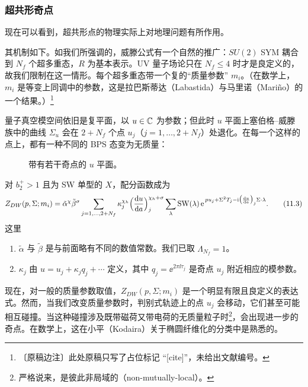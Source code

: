 \subsubsection{超共形奇点}

现在可以看到，超共形点的物理实际上对地理问题有所作用。

其机制如下。如我们所强调的，威滕公式有一个自然的推广：$SU(2)$ SYM 耦合到 $N_{f}$ 个超多重态，$R$ 为基本表示。UV 量子场论只在 $N_{f}\le4$ 时才是良定义的，故我们限制在这一情形。每个超多重态带一个复的“质量参数” $m_{i}$。（在数学上，$m_{i}$ 是等变上同调中的参数，这是拉巴斯蒂达（Labastida）与马里诺（Mariño）的一个结果。）\footnote{〔原稿边注〕此处原稿只写了占位标记 “[cite]”，未给出文献编号。}

量子真空模空间依旧是复平面，以 $u\in\mathbb{C}$ 为参数；但此时 $u$ 平面上塞伯格--威滕族中的曲线 $\Sigma_{u}$ 会在 $2+N_{f}$ 个点 $u_{j}$（$j=1,\dots,2+N_{f}$）处退化。在每一个这样的点上，都有一种不同的 BPS 态变为无质量：

\begin{figure}[H]
  \centering
  \caption{带有若干奇点的 $u$ 平面。}
  \label{fig:uplane-singularities}
\end{figure}

对 $b_{2}^{+}>1$ 且为 SW 单型的 $X$，配分函数成为
\begin{equation}
  Z_{DW}(p,\Sigma;m_{i})
  =\tilde\alpha^{\chi}\tilde\beta^{\sigma}
  \sum_{j=1,\dots,2+N_{f}}\kappa_{j}^{\chi_{h}}
  \Bigl(\frac{\mathrm{d} u}{\mathrm{d} a}\Bigr)_{j}^{\chi_{h}+\sigma}
  \sum_{\lambda}\mathrm{SW}(\lambda)\,
  \mathrm{e}^{\,p u_{j}+\Sigma^{2}T_{j}-\mathrm{i}\bigl(\frac{\mathrm{d} u}{\mathrm{d} a}\bigr)_{j}\Sigma\cdot\lambda}.
  \tag{11.3}
\end{equation}
这里
\begin{enumerate}[label=\arabic*., leftmargin=2.1em]
\item $\tilde\alpha$ 与 $\tilde\beta$ 是与前面略有不同的数值常数。我们已取 $\Lambda_{N_{f}}=1$。
\item $\kappa_{j}$ 由 $u=u_{j}+\kappa_{j}q_{j}+\cdots$ 定义，其中 $q_{j}=\ee^{2\pi\ii\tau_{j}}$ 是奇点 $u_{j}$ 附近相应的模参数。
\end{enumerate}

现在，对一般的质量参数取值，$Z_{DW}(p,\Sigma;m_{i})$ 是一个明显有限且良定义的表达式。然而，当我们改变质量参数时，判别式轨迹上的点 $u_{j}$ 会移动，它们甚至可能相互碰撞。当这种碰撞涉及既带磁荷又带电荷的无质量粒子时\footnote{严格说来，是彼此非局域的（non-mutually-local）。}，会出现进一步的奇点。在数学上，这在小平（Kodaira）关于椭圆纤维化的分类中是熟悉的。

